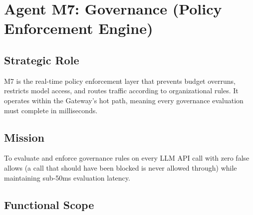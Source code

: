 \documentclass[12pt,a4paper,twoside]{report}
\begin{document}
\section{Agent M7: Governance (Policy Enforcement Engine)}

\subsection{Strategic Role}
M7 is the real-time policy enforcement layer that prevents budget overruns, restricts model access, and routes traffic according to organizational rules. It operates within the Gateway's hot path, meaning every governance evaluation must complete in milliseconds.

\subsection{Mission}
To evaluate and enforce governance rules on every LLM API call with zero false allows (a call that should have been blocked is never allowed through) while maintaining sub-50ms evaluation latency.

\subsection{Functional Scope}
\end{document}
